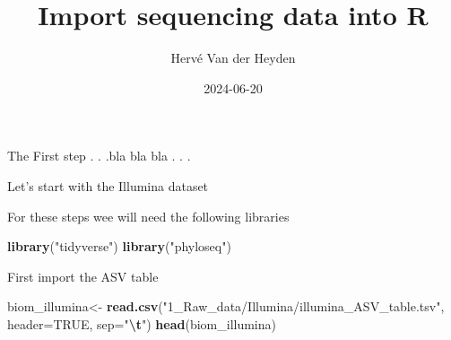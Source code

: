 \documentclass[
]{article}
\title{Import sequencing data into R}
\author{Hervé Van der Heyden}
\date{2024-06-20}
\newenvironment{Shaded}{\begin{snugshade}}{\end{snugshade}}
\newcommand{\AttributeTok}[1]{\textcolor[rgb]{0.13,0.29,0.53}{#1}}
\newcommand{\ConstantTok}[1]{\textcolor[rgb]{0.56,0.35,0.01}{#1}}
\newcommand{\FunctionTok}[1]{\textcolor[rgb]{0.13,0.29,0.53}{\textbf{#1}}}
\newcommand{\NormalTok}[1]{#1}
\newcommand{\OtherTok}[1]{\textcolor[rgb]{0.56,0.35,0.01}{#1}}
\newcommand{\SpecialCharTok}[1]{\textcolor[rgb]{0.81,0.36,0.00}{\textbf{#1}}}
\newcommand{\StringTok}[1]{\textcolor[rgb]{0.31,0.60,0.02}{#1}}
\begin{document}
\maketitle

The First step . . .bla bla bla . . .

Let's start with the Illumina dataset

For these steps wee will need the following libraries

\begin{Shaded}
\begin{Highlighting}[]
\FunctionTok{library}\NormalTok{(}\StringTok{"tidyverse"}\NormalTok{)}
\FunctionTok{library}\NormalTok{(}\StringTok{"phyloseq"}\NormalTok{)}
\end{Highlighting}
\end{Shaded}

First import the ASV table

\begin{Shaded}
\begin{Highlighting}[]
\NormalTok{biom\_illumina}\OtherTok{\textless{}{-}} \FunctionTok{read.csv}\NormalTok{(}\StringTok{"1\_Raw\_data/Illumina/illumina\_ASV\_table.tsv"}\NormalTok{, }
                        \AttributeTok{header=}\ConstantTok{TRUE}\NormalTok{, }\AttributeTok{sep=}\StringTok{"}\SpecialCharTok{\textbackslash{}t}\StringTok{"}\NormalTok{)}
\FunctionTok{head}\NormalTok{(biom\_illumina)}
\end{Highlighting}
\end{Shaded}
\end{document}
